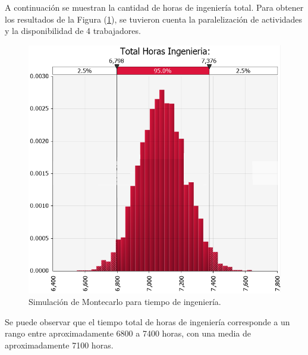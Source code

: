 A continuación se muestran la cantidad de horas de ingeniería total. Para obtener los resultados de la Figura (\ref{fig:montecarlo_tiempos_ing}), se tuvieron cuenta la paralelización de actividades y la disponibilidad de 4 trabajadores.
\begin{figure}[H]
	\centering
	\includegraphics[width=0.5\linewidth]{ImagenesFactibilidad/montecarlo_tiempo_largo}	
	\caption{Simulación de Montecarlo para tiempo de ingeniería.}
	\label{fig:montecarlo_tiempos_ing}
\end{figure}

Se puede observar que el tiempo total de horas de ingeniería corresponde a un rango entre aproximadamente 6800 a 7400 horas, con una media de aproximadamente 7100 horas.